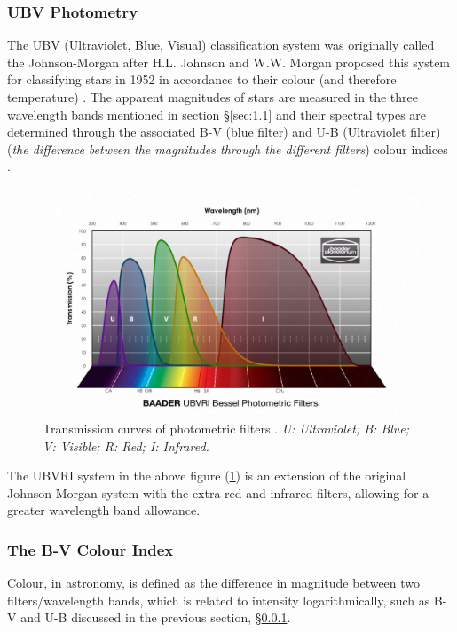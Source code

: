 \documentclass[12pt]{article}
\begin{document}
\subsubsection{UBV Photometry} \label{sec:1.1.1}

The UBV (Ultraviolet, Blue, Visual) classification system was originally called the Johnson-Morgan after H.L. Johnson and W.W. Morgan proposed this system for classifying stars in 1952 in accordance to their colour 
(and therefore temperature)
\cite{ubv1953}.
The apparent magnitudes of stars are measured in the three wavelength bands mentioned in section §\ref{sec:1.1} and their spectral types are determined through the associated B-V (blue filter) and U-B (Ultraviolet filter)
(\textit{the difference between the magnitudes through the different filters}) colour indices
\cite{ubv1953}.

\begin{figure}[H]
    \centering
    \includegraphics[width=12cm]{ubv.jpeg}
    \caption{\centering Transmission curves of photometric filters \protect\cite{ubvfilters}. \textit{U: Ultraviolet; B: Blue; V: Visible; R: Red; I: Infrared.}}
    \label{fig:ubvfilters}
\end{figure}

The UBVRI system in the above figure (\ref{fig:ubvfilters}) is an extension of the original Johnson-Morgan system with the extra red and infrared filters, allowing for a greater wavelength band allowance.

\subsubsection{The B-V Colour Index} \label{sec:1.1.2}

Colour, in astronomy, is defined as the difference in magnitude between two filters/wavelength bands, which is related to intensity logarithmically, 
\cite{sdsscolour,rochcolour,librecolour} such as B-V and U-B discussed in the previous section, §\ref{sec:1.1.1}.
\end{document}
